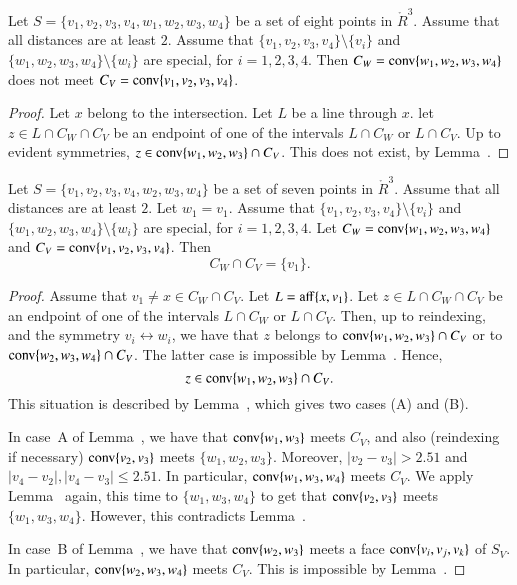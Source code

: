 \begin{lemma}
Let $S=\{v_1,v_2,v_3,v_4,w_1,w_2,w_3,w_4\}$ be a set of eight
points in $\ring{R}^3$.  Assume that all distances are at least $2$.
Assume that $\{v_1,v_2,v_3,v_4\}\setminus\{v_i\}$ and
$\{w_1,w_2,w_3,w_4\}\setminus\{w_i\}$ are special, for $i=1,2,3,4$.
Then $C_W ={\operatorname{conv}}\{w_1,w_2,w_3,w_4\}$ does not meet
$C_V = {\operatorname{conv}}\{v_1,v_2,v_3,v_4\}$.
\end{lemma}

\begin{proof}
Let $x$ belong to the intersection.  Let $L$ be a line through
$x$.  let $z\in L\cap C_W\cap C_V$ be an endpoint of one of the
intervals $L\cap C_W$ or $L\cap C_V$.  Up to evident symmetries,
$z\in {\operatorname{conv}}\{w_1,w_2,w_3\}\cap C_V$.  This does not exist,
by Lemma~.
\end{proof}

\newpage

\begin{lemma}
Let $S=\{v_1,v_2,v_3,v_4,w_2,w_3,w_4\}$ be a set of seven
points in $\ring{R}^3$. 
Assume that all distances are at least $2$.
Let $w_1=v_1$.
Assume that $\{v_1,v_2,v_3,v_4\}\setminus\{v_i\}$ and
$\{w_1,w_2,w_3,w_4\}\setminus\{w_i\}$ are special, for $i=1,2,3,4$.
Let 
   $C_W ={\operatorname{conv}}\{w_1,w_2,w_3,w_4\}$ and
$C_V = {\operatorname{conv}}\{v_1,v_2,v_3,v_4\}$.  
Then
  $$
  C_W \cap C_V = \{v_1\}.
  $$
\end{lemma}

\begin{proof}  Assume that $v_1\ne x\in C_W\cap C_V$.
Let $L={\operatorname{aff}}\{x,v_1\}$.  Let $z\in L\cap C_W\cap C_V$ be an endpoint
of one of the intervals $L\cap C_W$ or $L\cap C_V$.  Then, up
to reindexing, and the symmetry $v_i\leftrightarrow w_i$,  we have
that $z$
belongs to ${\operatorname{conv}}\{w_1,w_2,w_3\}\cap C_V$ or to
${\operatorname{conv}}\{w_2,w_3,w_4\}\cap C_V$.  The latter case is impossible
by Lemma~.  Hence,  
   $$z\in{\operatorname{conv}}\{w_1,w_2,w_3\}\cap C_V.$$  This situation
is described by Lemma~, which gives two cases (A)
and (B). 

In case~A of Lemma~, we have that
${\operatorname{conv}}\{w_1,w_3\}$ meets $C_V$, and also (reindexing if necessary)
${\operatorname{conv}}\{v_2,v_3\}$ meets $\{w_1,w_2,w_3\}$.
Moreover, $|v_2-v_3|>2.51$ and $|v_4-v_2|,|v_4-v_3|\le 2.51$.
In particular, ${\operatorname{conv}}\{w_1,w_3,w_4\}$
meets $C_V$.  We apply Lemma~ again, this
time to $\{w_1,w_3,w_4\}$ to get that ${\operatorname{conv}}\{v_2,v_3\}$ meets
$\{w_1,w_3,w_4\}$.  However, this contradicts Lemma~.

In case~B of Lemma~, 
we have that ${\operatorname{conv}}\{w_2,w_3\}$
meets a face ${\operatorname{conv}}\{v_i,v_j,v_k\}$ of $S_V$.  In particular,
${\operatorname{conv}}\{w_2,w_3,w_4\}$ meets $C_V$.  This is impossible
by Lemma~.
\end{proof}

